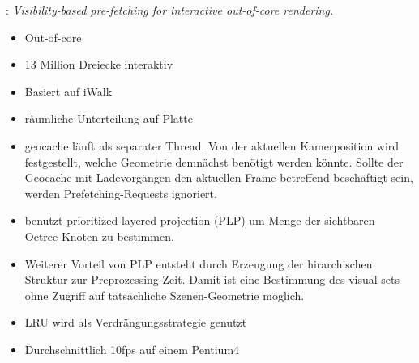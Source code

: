 \cite{wagner2}: \textit{Visibility-based pre-fetching for interactive out-of-core rendering.}
\begin{itemize}
 \item Out-of-core
 \item 13 Million Dreiecke interaktiv
 \item Basiert auf iWalk
 \item räumliche Unterteilung auf Platte
 \item geocache läuft als separater Thread. Von der aktuellen Kamerposition wird festgestellt, welche Geometrie demnächst benötigt werden könnte. Sollte der Geocache mit Ladevorgängen den aktuellen Frame betreffend beschäftigt sein, werden Prefetching-Requests ignoriert.
 \item benutzt prioritized-layered projection (PLP) um Menge der sichtbaren Octree-Knoten zu bestimmen.
 \item Weiterer Vorteil von PLP entsteht durch Erzeugung der hirarchischen Struktur zur Preprozessing-Zeit. Damit ist eine Bestimmung des visual sets ohne Zugriff auf tatsächliche Szenen-Geometrie möglich.
 \item LRU wird als Verdrängungsstrategie genutzt
 \item Durchschnittlich 10fps auf einem Pentium4
\end{itemize}

